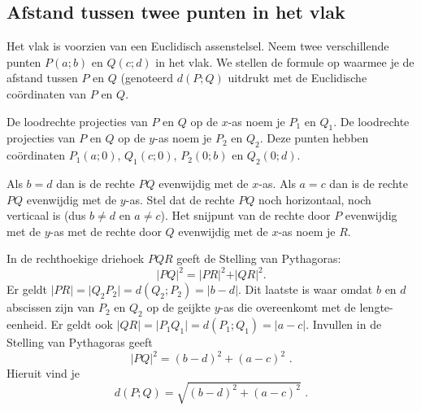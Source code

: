 \subsection{Afstand tussen twee punten in het vlak}
\noindent

Het vlak is voorzien van een Euclidisch assenstelsel.
Neem twee verschillende punten $P(a;b)$ en $Q(c;d)$ in het vlak.
We stellen de formule op waarmee je de afstand tussen $P$ en $Q$ (genoteerd $d(P;Q)$ uitdrukt met de Euclidische co\"ordinaten van $P$ en $Q$.

De loodrechte projecties van $P$ en $Q$ op de $x$-as noem je $P_1$ en $Q_1$.
De loodrechte projecties van $P$ en $Q$ op de $y$-as noem je $P_2$ en $Q_2$.
Deze punten hebben co\"ordinaten $P_1(a;0)$, $Q_1(c;0)$, $P_2(0;b)$ en $Q_2(0;d)$.

Als $b=d$ dan is de rechte $PQ$ evenwijdig met de $x$-as.
Als $a=c$ dan is de rechte $PQ$ evenwijdig met de $y$-as.
Stel dat de rechte $PQ$ noch horizontaal, noch verticaal is (dus $b\neq d$ en $a \neq c$).
Het snijpunt van de rechte door $P$ evenwijdig met de $y$-as met de rechte door $Q$ evenwijdig met de $x$-as noem je $R$.

\begin{center}
	
\end{center}



In de rechthoekige driehoek $PQR$ geeft de Stelling van Pythagoras:
\[
\vert PQ \vert ^2= \vert PR \vert ^2+ \vert QR \vert ^2 \text {.}
\]
Er geldt $\vert PR \vert = \vert Q_2P_2 \vert = d(Q_2;P_2)=\vert b-d \vert$.
Dit laatste is waar omdat $b$ en $d$ abscissen zijn van $P_2$ en $Q_2$ op de geijkte $y$-as die overeenkomt met de lengte-eenheid.
Er geldt ook $\vert QR \vert = \vert P_1Q_1 \vert = d(P_1;Q_1)=\vert a-c \vert$.
Invullen in de Stelling van Pythagoras geeft
\[
\vert PQ \vert ^2=(b-d)^2+(a-c)^2 \text{ .}
\]
Hieruit vind je
\[
d(P;Q)=\sqrt{(b-d)^2+(a-c)^2} \text { .}
\]\vspace{2mm}

